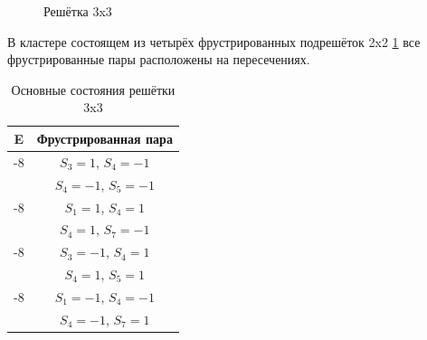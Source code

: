 \documentclass[utf8, babel, sor, jor, amsmath,amssymb, reprint]{elsarticle} %
\begin{document}
\begin{figure}[h]
	\centering
	\caption{Решётка 3x3}
	\label{fig:3x3}
\end{figure}

В кластере состоящем из четырёх фрустрированных подрешёток 2x2 \ref{fig:3x3} все фрустрированные пары расположены на пересечениях.

\begin{table}[h]
	\centering
	\begin{tabular}{|c|c|}
		\hline
		E   &   Фрустрированная пара \\
		\hline
		-8   &  $S_3=1$, $S_4=-1$\\
		&    $S_4=-1$, $S_5=-1$ \\
		\hline
		-8   &  $S_1=1$, $S_4=1$\\
		&    $S_4=1$, $S_7=-1$ \\
		\hline
		-8   &  $S_3=-1$, $S_4=1$\\
			&    $S_4=1$, $S_5=1$ \\
		\hline
		-8   &  $S_1=-1$, $S_4=-1$\\
			&    $S_4=-1$, $S_7=1$ \\
		\hline
	\end{tabular}
	\caption{Основные состояния решётки 3x3}
	\label{tab:gs_3x3}
\end{table} 
\end{document}
